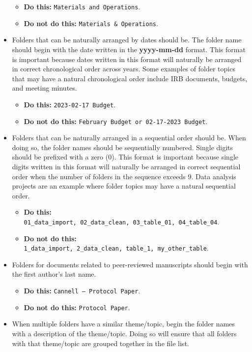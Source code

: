 \documentclass[
  letterpaper,
  DIV=11,
  numbers=noendperiod]{scrreprt}
\providecommand{\tightlist}{%
  \setlength{\itemsep}{0pt}\setlength{\parskip}{0pt}}\usepackage{longtable,booktabs,array}
\begin{document}
\begin{itemize}
  \begin{itemize}
  \tightlist
  \item
    \textbf{Do this:} \texttt{Materials\ and\ Operations}.
  \item
    \textbf{Do not do this:} \texttt{Materials\ \&\ Operations}.
  \end{itemize}
\item
  Folders that can be naturally arranged by dates should be. The folder
  name should begin with the date written in the \textbf{yyyy-mm-dd}
  format. This format is important because dates written in this format
  will naturally be arranged in correct chronological order across
  years. Some examples of folder topics that may have a natural
  chronological order include IRB documents, budgets, and meeting
  minutes.

  \begin{itemize}
  \tightlist
  \item
    \textbf{Do this:} \texttt{2023-02-17\ Budget}.
  \item
    \textbf{Do not do this:}
    \texttt{February\ Budget\ or\ 02-17-2023\ Budget}.
  \end{itemize}
\item
  Folders that can be naturally arranged in a sequential order should
  be. When doing so, the folder names should be sequentially numbered.
  Single digits should be prefixed with a zero (0). This format is
  important because single digits written in this format will naturally
  be arranged in correct sequential order when the number of folders in
  the sequence exceeds 9. Data analysis projects are an example where
  folder topics may have a natural sequential order.

  \begin{itemize}
  \tightlist
  \item
    \textbf{Do this:}
    \texttt{01\_data\_import,\ 02\_data\_clean,\ 03\_table\_01,\ 04\_table\_04}.
  \item
    \textbf{Do not do this:}
    \texttt{1\_data\_import,\ 2\_data\_clean,\ table\_1,\ my\_other\_table}.
  \end{itemize}
\item
  Folders for documents related to peer-reviewed manuscripts should
  begin with the first author's last name.

  \begin{itemize}
  \tightlist
  \item
    \textbf{Do this:} \texttt{Cannell\ –\ Protocol\ Paper}.
  \item
    \textbf{Do not do this:} \texttt{Protocol\ Paper}.
  \end{itemize}
\item
  When multiple folders have a similar theme/topic, begin the folder
  names with a description of the theme/topic. Doing so will ensure that
  all folders with that theme/topic are grouped together in the file
  list.


\end{itemize}
\end{document}
